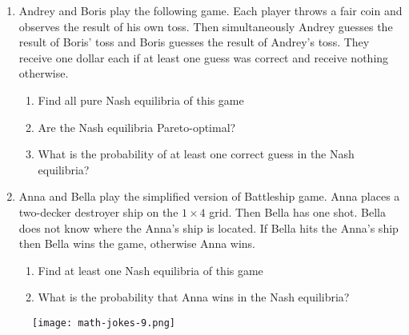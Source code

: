 \documentclass[12pt,a4paper]{article}
\begin{document}
\begin{enumerate}[resume]

\item Andrey and Boris play the following game. Each player throws a fair coin and observes the result of his own toss. Then simultaneously Andrey guesses the result of Boris' toss and Boris guesses the result of Andrey's toss. They receive one dollar each if at least one guess was correct and receive nothing otherwise. 

\begin{enumerate}
\item Find all pure Nash equilibria of this game
\item Are the Nash equilibria Pareto-optimal?
\item What is the probability of at least one correct guess in the Nash equilibria?
\end{enumerate}

\item Anna and Bella play the simplified version of Battleship game. Anna places a two-decker destroyer ship on the $1\times 4$ grid. Then Bella has one shot. Bella does not know where the Anna's ship is located. If Bella hits the Anna's ship then Bella wins the game, otherwise Anna wins. 

\begin{enumerate}
\item Find at least one Nash equilibria of this game
\item What is the probability that Anna wins in the Nash equilibria?
\end{enumerate}
\end{enumerate}

\begin{figure}[hbtp]
\centering
\texttt{[image: math-jokes-9.png]}
\end{figure}
\end{document}
